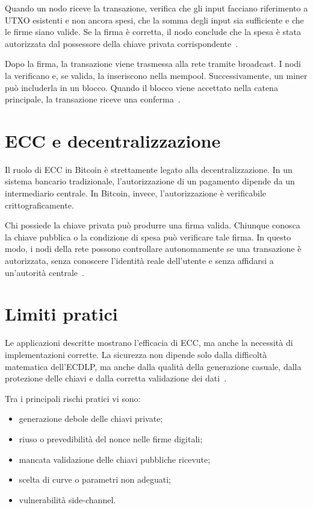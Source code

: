 \documentclass[12pt,a4paper,oneside]{report}
\begin{document}
Quando un nodo riceve la transazione, verifica che gli input facciano riferimento a UTXO esistenti e non ancora spesi, che la somma degli input sia sufficiente e che le firme siano valide. Se la firma è corretta, il nodo conclude che la spesa è stata autorizzata dal possessore della chiave privata corrispondente~\cite{margara_bitcoin}.

Dopo la firma, la transazione viene trasmessa alla rete tramite broadcast. I nodi la verificano e, se valida, la inseriscono nella mempool. Successivamente, un miner può includerla in un blocco. Quando il blocco viene accettato nella catena principale, la transazione riceve una conferma~\cite{margara_bitcoin}.

\section{ECC e decentralizzazione}

Il ruolo di ECC in Bitcoin è strettamente legato alla decentralizzazione. In un sistema bancario tradizionale, l'autorizzazione di un pagamento dipende da un intermediario centrale. In Bitcoin, invece, l'autorizzazione è verificabile crittograficamente.

Chi possiede la chiave privata può produrre una firma valida. Chiunque conosca la chiave pubblica o la condizione di spesa può verificare tale firma. In questo modo, i nodi della rete possono controllare autonomamente se una transazione è autorizzata, senza conoscere l'identità reale dell'utente e senza affidarsi a un'autorità centrale~\cite{margara_bitcoin,nakamoto_bitcoin}.

\section{Limiti pratici}

Le applicazioni descritte mostrano l'efficacia di ECC, ma anche la necessità di implementazioni corrette. La sicurezza non dipende solo dalla difficoltà matematica dell'ECDLP, ma anche dalla qualità della generazione casuale, dalla protezione delle chiavi e dalla corretta validazione dei dati~\cite{sec1}.

Tra i principali rischi pratici vi sono:

\begin{itemize}
    \item generazione debole delle chiavi private;
    \item riuso o prevedibilità del nonce nelle firme digitali;
    \item mancata validazione delle chiavi pubbliche ricevute;
    \item scelta di curve o parametri non adeguati;
    \item vulnerabilità side-channel.
\end{itemize}
\end{document}
